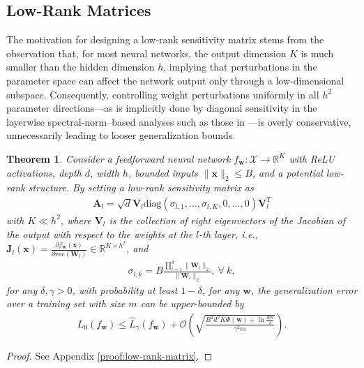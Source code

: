 \documentclass[journal]{IEEEtran} %
\newtheorem{theorem}{Theorem}%
\def\vw{{\bm{w}}}
\def\vx{{\bm{x}}}
\def\mA{{\bm{A}}}
\def\mJ{{\bm{J}}}
\def\mV{{\bm{V}}}
\def\mW{{\bm{W}}}
\def\gO{{\mathcal{O}}}
\def\gX{{\mathcal{X}}}
\newcommand{\R}{\mathbb{R}}
\newcommand{\Norm}[1]{\|#1\|}
\begin{document}
\subsection{Low-Rank Matrices}
The motivation for designing a low-rank sensitivity matrix stems from the observation that, for most neural networks, the output dimension $K$ is much smaller than the hidden dimension $h$, implying that perturbations in the parameter space can affect the network output only through a low-dimensional subspace. Consequently, controlling weight perturbations uniformly in all $h^2$ parameter directions—as is implicitly done by diagonal sensitivity in the layerwise spectral-norm–based analyses such as those in \cite{neyshabur2018pac}—is overly conservative, unnecessarily leading to looser generalization bounds.

\begin{theorem}\label{thm:low-rank-matrix}
Consider a feedforward neural network $f_{\vw}: \gX \to \R^K$ with ReLU activations, depth $d$, width $h$, bounded inputs $\Norm{\vx}_2 \le B$, and a potential low-rank structure.
    By setting a low-rank sensitivity matrix as 
\begin{align} \label{eq:low-rank-Al}
    \mA_l = \sqrt{d} \mV_l \mathrm{diag}(\sigma_{l,1},\dots,\sigma_{l,K},0,\dots,0)\mV_l^T
\end{align}
with $K\ll h^2$, where $\mV_l$ is the collection of right eigenvectors of the Jacobian of the output with respect to the weights at the $l$-th layer, i.e., $\mJ_l(\vx) = \frac{\partial f_{\vw}(\vx)}{\partial \mathrm{vec}(\mW_l)} \in \R^{K \times h^2}$, and
\begin{align}
    \sigma_{l,k} = B\frac{\prod_{l=1}^d \Norm{\mW_l}_2}{\Norm{\mW_l}_2}, \ \forall~k,
\end{align}
 for any $\delta,\gamma>0$, with probability at least $1-\delta$, for any $\vw$, the generalization error over a training set with size $m$ can be upper-bounded by
    \begin{align}
    L_0(f_{\vw}) \le \hat{L}_{\gamma}(f_{\vw}) + \gO \left( \sqrt{ \frac{B^2d^2K \Phi(\vw) + \ln \frac{dm}{\delta}}{\gamma^2m}} \right).
    \end{align}
\end{theorem}
\begin{proof}
See Appendix \ref{proof:low-rank-matrix}.
\end{proof}
\end{document}
